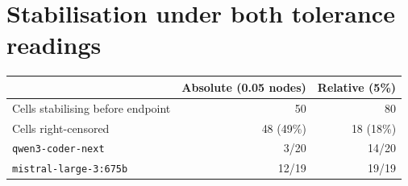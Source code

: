 \documentclass{article}
\begin{document}
\section{Stabilisation under both tolerance readings}
\label{app:tolerance}

\begin{center}
\small
\begin{tabular}{lrr}
\toprule
& Absolute (0.05 nodes) & Relative (5\%) \\
\midrule
Cells stabilising before endpoint & 50 & 80 \\
Cells right-censored              & 48 (49\%) & 18 (18\%) \\
\texttt{qwen3-coder-next}         & 3/20 & 14/20 \\
\texttt{mistral-large-3:675b}     & 12/19 & 19/19 \\
\bottomrule
\end{tabular}
\end{center}




\end{document}
